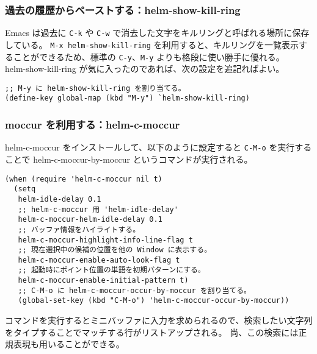 \subsubsection{過去の履歴からペーストする：helm-show-kill-ring}
Emacs は過去に \texttt{C-k} や \texttt{C-w} で消去した文字をキルリングと呼ばれる場所に保存している。
\texttt{M-x helm-show-kill-ring} を利用すると、キルリングを一覧表示することができるため、標準の \texttt{C-y}、\texttt{M-y} よりも格段に使い勝手に優れる。\\

helm-show-kill-ring が気に入ったのであれば、次の設定を追記ればよい。
\begin{mdframed}[roundcorner=0.50zw,leftmargin=3.00zw,rightmargin=3.00zw,skipabove=0.40zw,skipbelow=0.40zw,innertopmargin=4.00pt,innerbottommargin=4.00pt,innerleftmargin=5.00pt,innerrightmargin=5.00pt,linecolor=gray!020,linewidth=0.50pt,backgroundcolor=gray!20]
\begin{verbatim}
;; M-y に helm-show-kill-ring を割り当てる。
(define-key global-map (kbd "M-y") `helm-show-kill-ring)
\end{verbatim}
\end{mdframed}
\subsubsection{moccur を利用する：helm-c-moccur}
helm-c-moccur をインストールして、以下のように設定すると \texttt{C-M-o} を実行することで helm-c-moccur-by-moccur というコマンドが実行される。
\begin{mdframed}[roundcorner=0.50zw,leftmargin=3.00zw,rightmargin=3.00zw,skipabove=0.40zw,skipbelow=0.40zw,innertopmargin=4.00pt,innerbottommargin=4.00pt,innerleftmargin=5.00pt,innerrightmargin=5.00pt,linecolor=gray!020,linewidth=0.50pt,backgroundcolor=gray!20]
\begin{verbatim}
(when (require 'helm-c-moccur nil t)
  (setq
   helm-idle-delay 0.1
   ;; helm-c-moccur 用 'helm-idle-delay'
   helm-c-moccur-helm-idle-delay 0.1
   ;; バッファ情報をハイライトする。
   helm-c-moccur-highlight-info-line-flag t
   ;; 現在選択中の候補の位置を他の Window に表示する。
   helm-c-moccur-enable-auto-look-flag t
   ;; 起動時にポイント位置の単語を初期パターンにする。
   helm-c-moccur-enable-initial-pattern t)
   ;; C-M-o に helm-c-moccur-occur-by-moccur を割り当てる。
   (global-set-key (kbd "C-M-o") 'helm-c-moccur-occur-by-moccur))
\end{verbatim}
\end{mdframed}
コマンドを実行するとミニバッファに入力を求められるので、検索したい文字列をタイプすることでマッチする行がリストアップされる。
尚、この検索には正規表現も用いることができる。
